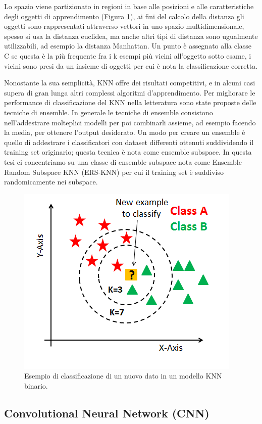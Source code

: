 Lo spazio viene partizionato in regioni in base alle posizioni e alle caratteristiche degli oggetti di apprendimento (Figura \ref{fig:knn}), ai fini del calcolo della distanza gli oggetti sono rappresentati attraverso vettori in uno spazio multidimensionale, spesso si usa la distanza euclidea, ma anche altri tipi di distanza sono ugualmente utilizzabili, ad esempio la distanza Manhattan. 
Un punto è assegnato alla classe C se questa è la più frequente fra i k esempi più vicini all'oggetto sotto esame, i vicini sono presi da un insieme di oggetti per cui è nota la classificazione corretta. 

Nonostante la sua semplicità, KNN offre dei risultati competitivi, e in alcuni casi supera di gran lunga altri complessi algoritmi d'apprendimento. Per migliorare le performance di classificazione del KNN nella letteratura sono state proposte delle tecniche di ensemble. In generale le tecniche di ensemble consistono nell'addestrare molteplici modelli per poi combinarli assieme, ad esempio facendo la media, per ottenere l'output desiderato. Un modo per creare un ensemble è quello di addestrare i classificatori con dataset differenti ottenuti suddividendo il training set originario; 
questa tecnica è nota come ensemble subspace. In questa tesi ci concentriamo su una classe di ensemble subspace nota come Ensemble Random Subspace KNN (ERS-KNN) per cui il training set è suddiviso randomicamente nei subspace.

\begin{figure}[!htb]
    \centering
    \includegraphics[width=.5\textwidth]{figure/knn.png}
    \caption{Esempio di classificazione di un nuovo dato in un modello KNN binario.}
    \label{fig:knn}
\end{figure}

\subsection{Convolutional Neural Network (CNN)}
\label{ssec:convolutional-neural-network}

